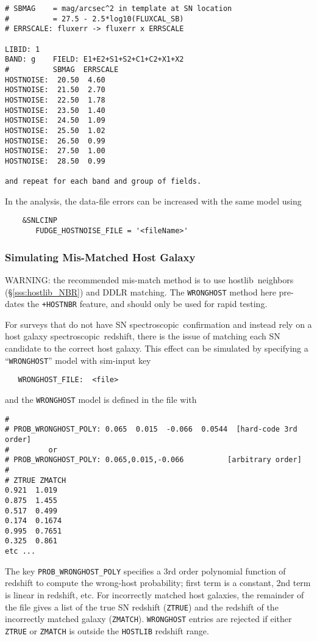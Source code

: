 \documentclass[12pt]{article}
\newcommand{\hostlib}{{\sc hostlib}}
\newcommand{\spec}{spectroscopic}
\begin{document}
{\begin{Verbatim}[frame=single]
# SBMAG    = mag/arcsec^2 in template at SN location 
#          = 27.5 - 2.5*log10(FLUXCAL_SB) 
# ERRSCALE: fluxerr -> fluxerr x ERRSCALE 

LIBID: 1 
BAND: g    FIELD: E1+E2+S1+S2+C1+C2+X1+X2 
#          SBMAG  ERRSCALE  
HOSTNOISE:  20.50  4.60 
HOSTNOISE:  21.50  2.70 
HOSTNOISE:  22.50  1.78 
HOSTNOISE:  23.50  1.40 
HOSTNOISE:  24.50  1.09 
HOSTNOISE:  25.50  1.02 
HOSTNOISE:  26.50  0.99 
HOSTNOISE:  27.50  1.00 
HOSTNOISE:  28.50  0.99 

and repeat for each band and group of fields.
\end{Verbatim}
%
In the analysis, the data-file errors can be increased
with the same model using
\begin{verbatim}
    &SNLCINP
       FUDGE_HOSTNOISE_FILE = '<fileName>'
\end{verbatim}


   \subsubsection{Simulating Mis-Matched Host Galaxy}
   \label{sss:sim_wronghost}

WARNING: the recommended mis-match method is to use \hostlib\ neighbors
(\S\ref{sss:hostlib_NBR}) and DDLR matching. The {\tt WRONGHOST} method
here pre-dates the {\tt +HOSTNBR} feature, 
and should only be used for rapid testing.

For surveys that do not have SN \spec\ confirmation and instead
rely on a host galaxy \spec\ redshift, there is the issue of
matching each SN candidate to the correct host galaxy. 
This effect can be simulated by specifying a ``{\tt WRONGHOST}'' 
model with sim-input key 
%
\begin{verbatim}
   WRONGHOST_FILE:  <file> 
\end{verbatim}
%
and the {\tt WRONGHOST}  model is defined in the file with
%
\begin{Verbatim}[frame=single]
#
# PROB_WRONGHOST_POLY: 0.065  0.015  -0.066  0.0544  [hard-code 3rd order]
#         or
# PROB_WRONGHOST_POLY: 0.065,0.015,-0.066          [arbitrary order]
#
# ZTRUE ZMATCH 
0.921  1.019
0.875  1.455
0.517  0.499
0.174  0.1674
0.995  0.7651
0.325  0.861 
etc ...
\end{Verbatim}
%
The key {\tt PROB\_WRONGHOST\_POLY} specifies a 3rd order
polynomial function of redshift to compute the wrong-host
probability; first term is a constant, 2nd term is linear in redshift, etc.
For incorrectly matched host galaxies, the remainder of the file 
gives a list of the true SN redshift
({\tt ZTRUE}) and the redshift of the incorrectly matched
galaxy ({\tt ZMATCH}).
{\tt WRONGHOST} entries are rejected if either {\tt ZTRUE}
or {\tt ZMATCH} is outside the {\tt HOSTLIB} redshift range.

}
\end{document}
